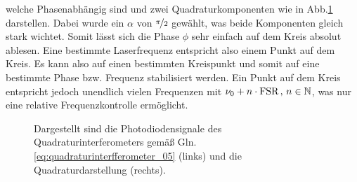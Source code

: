 welche Phasenabhängig sind und zwei Quadraturkomponenten wie in
Abb.\ref{fig:quadratursignale} darstellen. Dabei wurde ein $\alpha$ von
$\nicefrac{\pi}{2}$ gewählt, was beide Komponenten gleich stark wichtet. Somit
lässt sich die Phase $\phi$ sehr einfach auf dem Kreis absolut ablesen. Eine
bestimmte Laserfrequenz entspricht also einem Punkt auf dem Kreis. Es kann also
auf einen bestimmten Kreispunkt und somit auf eine bestimmte Phase bzw. Frequenz
stabilisiert werden. Ein Punkt auf dem Kreis entspricht jedoch unendlich vielen
Frequenzen mit $\nu_0+n\cdot\text{FSR}\,,\,n\in\mathbb{N}$, was nur eine relative
Frequenzkontrolle ermöglicht.
\begin{figure}[h]
	\centering
	\footnotesize
	
	\caption[Quadratursignale]{Dargestellt sind die
	Photodiodensignale des Quadraturinterferometers
	gemäß Gln. \eqref{eq:quadraturinterfferometer_05}
	(links) und die Quadraturdarstellung (rechts).}\label{fig:quadratursignale}
\end{figure}


